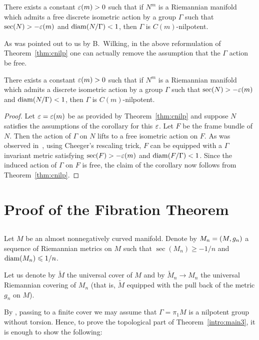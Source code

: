\documentclass{amsart}
\begin{document}
There exists a constant $\varepsilon(m)>0$ such that if $N^m$  is a Riemannian manifold which admits a free discrete isometric action by a  group $\Gamma$
such that $\sec(N)\z> -\eps(m)$ and $\operatorname{\rm diam}(N/\Gamma)<1$,
then $\Gamma$ is $C(m)$-nilpotent.


As was pointed out to us by B.~Wilking,
in the above reformulation of Theorem~\ref{thm:cnilp}
one can actually remove the assumption
that the $\Gamma$ action be free.

\begin{cor}\label{cor:nonfree}
There exists a constant $\varepsilon(m)>0$ such that
if $N^m$  is a Riemannian manifold
which admits a discrete  isometric action by a  group $\Gamma$
such that $\sec(N)> -\varepsilon(m)$ and $\operatorname{\rm diam}(N/\Gamma)<1$,
then $\Gamma$ is $C(m)$-nilpotent.
\end{cor}
\begin{proof}
Let $\varepsilon=\varepsilon(m)$ be as provided by Theorem~\ref{thm:cnilp}
and suppose $N$ satisfies the assumptions of the corollary for this $\varepsilon$.
Let $F$ be the frame bundle of $N$.
Then the action of $\Gamma$ on $N$ lifts to a free isometric action on $F$.
As was observed in~\cite{FY},
using Cheeger's rescaling trick,
$F$ can be equipped with a $\Gamma$ invariant metric
satisfying $\sec(F)>-\varepsilon(m)$ and $\operatorname{\rm diam}(F/\Gamma)<1$.
Since the induced action of $\Gamma$ on $F$ is free,
the claim of the corollary now follows from Theorem~\ref{thm:cnilp}.
\end{proof}




\section{Proof of the Fibration Theorem}\label{sec:fib}
\subsection{} Let $M$ be an almost nonnegatively curved manifold.
Denote by $M_n\z=(M,g_n)$
a sequence of Riemannian metrics on $M$ such that $\sec(M_n)\ge -1/n$
and $\operatorname{\rm diam}(M_n)\leqslant 1/n$.

Let us denote by $\tilde M$ the universal cover of $M$ and by
$\tilde M_n\to M_n$
the universal Riemannian covering of $M_n$
(that is, $\tilde M$ equipped with the pull back of the metric $g_n$ on $M$).

By \cite{FY}, passing to a finite cover
we may assume that $\Gamma=\pi_1M$ is a nilpotent group without torsion.
Hence, to prove the topological part of Theorem~\ref{intro:main3},
it is enough to show the following:
\end{document}
